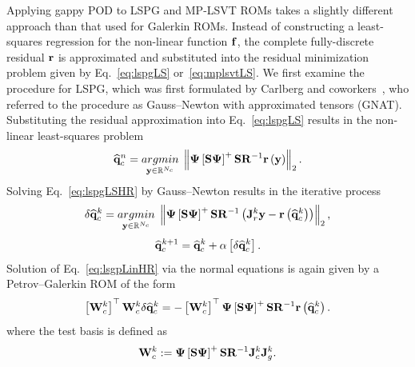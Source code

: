 Applying gappy POD to LSPG and MP-LSVT ROMs takes a slightly different approach than that used for Galerkin ROMs. Instead of constructing a least-squares regression for the non-linear function $\mathbf{f}$, the complete fully-discrete residual $\mathbf{r}$ is approximated and substituted into the residual minimization problem given by Eq.~\ref{eq:lspgLS} or~\ref{eq:mplsvtLS}. We first examine the procedure for LSPG, which was first formulated by Carlberg and coworkers~\cite{Carlberg2010,Carlberg2013}, who referred to the procedure as Gauss--Newton with approximated tensors (GNAT). Substituting the residual approximation into Eq.~\ref{eq:lspgLS} results in the non-linear least-squares problem
%
\begin{equation}\label{eq:lspgLSHR}
    \consVecCoef^{\timeIdx} = \argmin{\dummyVec \inROne{\numConsModes}} \left\Vert \deimBasis \left[ \sampMat \deimBasis \right]^{+} \sampMat \resScaleInv \resFunc{\dummyVec} \right\Vert_2.
\end{equation}
%
Solving Eq.~\ref{eq:lspgLSHR} by Gauss--Newton results in the iterative process
%
\begin{equation}\label{eq:lsgpLinHR}
    \delta \consVecCoef^{\newtonIdx} = \argmin{\dummyVec \inROne{\numConsModes}} \left\Vert \deimBasis \left[ \sampMat \deimBasis \right]^{+} \sampMat \resScaleInv \left( \jacobRes^{\newtonIdx} \dummyVec - \resFunc{\consVecCoef^{\newtonIdx}}\right) \right\Vert_2,
\end{equation}
\begin{equation}
    \mathbf{\widehat{q}}_{c}^{k + 1} = \mathbf{\widehat{q}}_{c}^{k} + \alpha \left[ \delta \mathbf{\widehat{q}}_{c}^{k} \right].
\end{equation}
%
Solution of Eq.~\ref{eq:lsgpLinHR} via the normal equations is again given by a Petrov--Galerkin ROM of the form
%
\begin{equation}\label{eq:lspgHRSolve}
    \left[ \testBasisCons^\newtonIdx \right]^\top \testBasisCons^\newtonIdx \delta \consVecCoef^{\newtonIdx} = -\left[\testBasisCons^\newtonIdx \right]^\top \deimBasis \left[ \sampMat \deimBasis \right]^{+} \sampMat \resScaleInv \resFunc{\consVecCoef^{\newtonIdx}}.
\end{equation}
%
where the test basis is defined as
%
\begin{equation}\label{eq:lspgHRTest}
    \testBasisCons^\newtonIdx \defEq \deimBasis \left[ \sampMat \deimBasis \right]^{+} \sampMat \resScaleInv \jacobCons^{\newtonIdx} \jacobDecode^{\newtonIdx}.
\end{equation}
%

